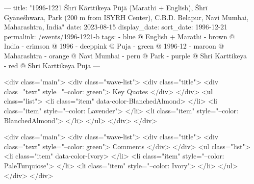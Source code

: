 ---
title: "1996-1221 Śhrī Kārttikeya Pūjā (Marathi + English), Śhrī Gyāneśhwara, Park (200 m from ISYRH Center), C.B.D. Belapur, Navi Mumbai, Maharashtra, India"
date: 2023-08-15
display_date: 
sort_date: 1996-12-21
permalink: /events/1996-1221-b
tags:
  - blue @ English + Marathi
  - brown @ India
  - crimson @ 1996
  - deeppink @ Puja
  - green @ 1996-12
  - maroon @ Maharashtra
  - orange @ Navi Mumbai
  - peru @ Park
  - purple @ Shri Karttikeya
  - red @ Shri Karttikeya Puja
---

<div class="main">
  <div class="wave-list">
    <div class="title">
      <div class="text" style="--color: green">
        Key Quotes
      </div>
    </div>
    <ul class="list">
        <li class="item" data-color-BlanchedAlmond>
        </li>
        <li class="item" style="--color: Lavender">
        </li>
        <li class="item" style="--color: BlanchedAlmond">
        </li>
      </ul>
  </div>
</div>

<div class="main">
  <div class="wave-list">
    <div class="title">
      <div class="text" style="--color: green">
        Comments
      </div>
    </div>
    <ul class="list">
        <li class="item" data-color-Ivory>
        </li>
        <li class="item" style="--color: PaleTurquiose">
        </li>
        <li class="item" style="--color: Ivory">
        </li>
      </ul>
  </div>
</div>
